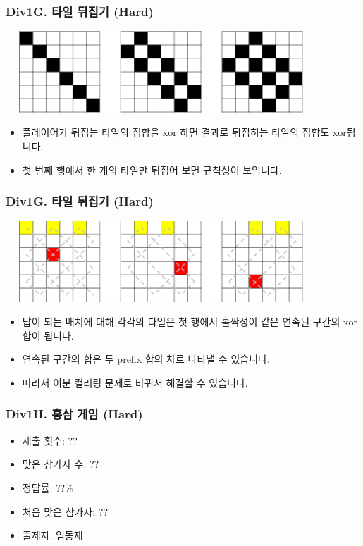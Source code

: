 \documentclass[xetex]{beamer}
\begin{document}
\begin{frame}
  \frametitle{Div1G. 타일 뒤집기 (Hard)}
  \begin{center}
    \includegraphics[width=0.8\textwidth]{tile2-sol1.png}
  \end{center}
  \begin{itemize}
    \item 플레이어가 뒤집는 타일의 집합을 xor 하면 결과로 뒤집히는 타일의 집합도 xor됩니다.
    \item 첫 번째 행에서 한 개의 타일만 뒤집어 보면 규칙성이 보입니다.
  \end{itemize}
\end{frame}

\begin{frame}
  \frametitle{Div1G. 타일 뒤집기 (Hard)}
  \begin{center}
    \includegraphics[width=0.8\textwidth]{tile2-sol2.png}
  \end{center}
  \begin{itemize}
    \item 답이 되는 배치에 대해 각각의 타일은 첫 행에서 홀짝성이 같은 연속된 구간의 xor 합이 됩니다.
    \item 연속된 구간의 합은 두 prefix 합의 차로 나타낼 수 있습니다.
    \item 따라서 이분 컬러링 문제로 바꿔서 해결할 수 있습니다.
  \end{itemize}
\end{frame}

\begin{frame}
  \frametitle{Div1H. 홍삼 게임 (Hard)}
  \begin{itemize}
    \item 제출 횟수: ??
    \item 맞은 참가자 수: ??
    \item 정답률: ??\%
    \item 처음 맞은 참가자: ??
    \item 출제자: 임동재
  \end{itemize}
\end{frame}
\end{document}
